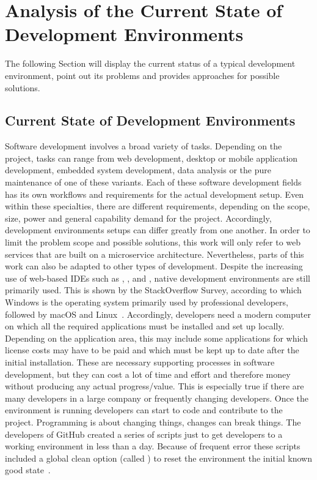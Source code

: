 \documentclass[12pt, a4paper]{article}
\begin{document}
\section{Analysis of the Current State of Development Environments}\label{sec::problem}
The following Section will display the current status of a typical development environment, point out its problems and provides approaches for possible solutions.

    \subsection{Current State of Development Environments}
    Software development involves a broad variety of tasks. Depending on the project, tasks can range from web development, desktop or mobile application development, embedded system development, data analysis or the pure maintenance of one of these variants. Each of these software development fields has its own workflows and requirements for the actual development setup. Even within these specialties, there are different requirements, depending on the scope, size, power and general capability demand for the project. Accordingly, development environments setups can differ greatly from one another. In order to limit the problem scope and possible solutions, this work will only refer to web services that are built on a microservice architecture. Nevertheless, parts of this work can also be adapted to other types of development.\newline
    Despite the increasing use of web-based \ac{IDE}s such as , ,  and , native development environments are still primarily used. This is shown by the StackOverflow Survey, according to which Windows is the operating system primarily used by professional developers, followed by macOS and Linux~\cite{stackoverflow2021}. Accordingly, developers need a modern computer on which all the required applications must be installed and set up locally. Depending on the application area, this may include some applications for which license costs may have to be paid and which must be kept up to date after the initial installation. These are necessary supporting processes in software development, but they can cost a lot of time and effort and therefore money without producing any actual progress/value. This is especially true if there are many developers in a large company or frequently changing developers. Once the environment is running developers can start to code and contribute to the project. Programming is about changing things, changes can break things. The developers of GitHub created a series of scripts just to get developers to a working environment in less than a day. Because of frequent error these scripts included a global clean option (called ) to reset the environment the initial known good state~\cite{githubblogcodespace}.\newline
\end{document}
